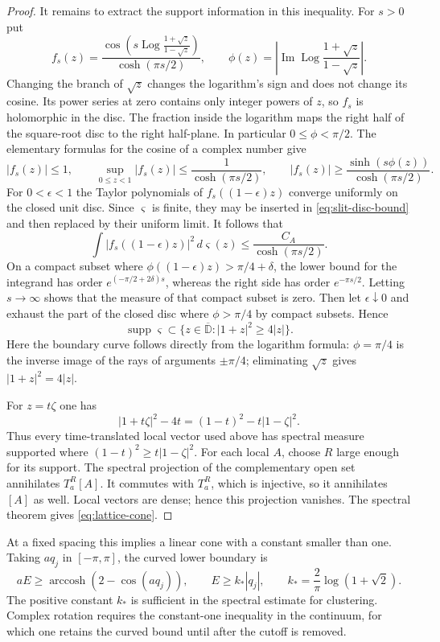 \documentclass[11pt,letterpaper,reqno]{amsart}
\theoremstyle{definition}
\theoremstyle{remark}
\begin{document}
\begin{proof}
It remains to extract the support information in this inequality.
For $s>0$ put
\[
 f_s(z)=\frac{\cos\!\left(s\operatorname{Log}
             \frac{1+\sqrt z}{1-\sqrt z}\right)}{\cosh(\pi s/2)},
 \qquad
 \phi(z)=\left|\operatorname{Im}\operatorname{Log}
                    \frac{1+\sqrt z}{1-\sqrt z}\right|.
\]
Changing the branch of $\sqrt z$ changes the logarithm's sign and
does not change its cosine. Its power series at zero contains only
integer powers of $z$, so $f_s$ is holomorphic in the disc. The
fraction inside the logarithm maps the right half of the square-root
disc to the right half-plane. In particular $0\le\phi<\pi/2$.
The elementary formulas for the cosine of a complex number give
\[
 |f_s(z)|\le1,\qquad
 \sup_{0\le z<1}|f_s(z)|\le\frac1{\cosh(\pi s/2)},\qquad
 |f_s(z)|\ge\frac{\sinh(s\phi(z))}{\cosh(\pi s/2)}.
\]
For $0<\epsilon<1$ the Taylor polynomials of
$f_s((1-\epsilon)z)$ converge uniformly on the closed unit disc.
Since $\varsigma$ is finite, they may be inserted in
\eqref{eq:slit-disc-bound} and then replaced by their uniform limit.
It follows that
\[
 \int|f_s((1-\epsilon)z)|^2\,d\varsigma(z)
 \le\frac{C_A}{\cosh(\pi s/2)}.
\]
On a compact subset where $\phi((1-\epsilon)z)>\pi/4+\delta$,
the lower bound for the integrand has order
$e^{(-\pi/2+2\delta)s}$, whereas the right side has order
$e^{-\pi s/2}$. Letting $s\to\infty$ shows that the measure of
that compact subset is zero. Then let $\epsilon\downarrow0$ and
exhaust the part of the closed disc where $\phi>\pi/4$ by compact subsets.
Hence
\[
 \operatorname{supp}\varsigma\subset
     \{z\in\overline{\mathbb D}:|1+z|^2\ge4|z|\}.
\]
Here the boundary curve follows directly from the logarithm formula:
$\phi=\pi/4$ is the inverse image of the rays of arguments
$\pm\pi/4$; eliminating $\sqrt z$ gives $|1+z|^2=4|z|$.

For $z=t\zeta$ one has
\[
 |1+t\zeta|^2-4t=(1-t)^2-t|1-\zeta|^2.
\]
Thus every time-translated local vector used above has spectral
measure supported where $(1-t)^2\ge t|1-\zeta|^2$.
For each local $A$, choose $R$ large enough for its support. The
spectral projection of the complementary open set annihilates
$T_a^R[A]$. It commutes with $T_a^R$, which is injective, so it
annihilates $[A]$ as well. Local vectors are dense; hence this
projection vanishes. The spectral theorem gives \eqref{eq:lattice-cone}.
\end{proof}

At a fixed spacing this implies a linear cone with a constant smaller
than one. Taking $aq_j$ in $[-\pi,\pi]$, the curved lower boundary is
\[
 aE\ge\operatorname{arccosh}(2-\cos(aq_j)),\qquad
 E\ge k_*|q_j|,\qquad
 k_*=\frac2\pi\log(1+\sqrt2).
\]
The positive constant $k_*$ is sufficient in the spectral estimate for
clustering. Complex rotation requires the constant-one inequality in
the continuum, for which one retains the curved bound until after
the cutoff is removed.
\end{document}
